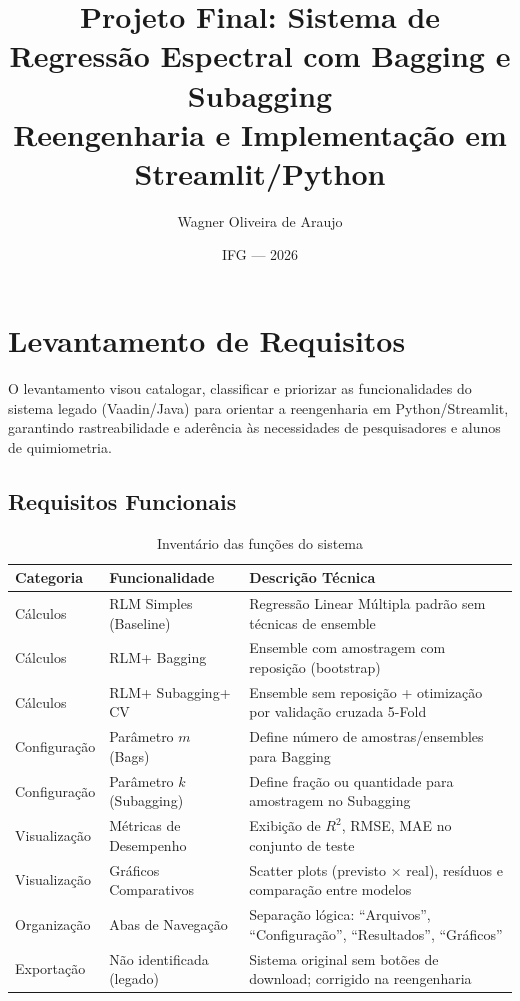 \documentclass[12pt,a4paper]{article}
\begin{document}
\title{\textbf{Projeto Final: Sistema de Regressão Espectral com Bagging e Subagging}\\
\small Reengenharia e Implementação em Streamlit/Python}
\author{Wagner Oliveira de Araujo}
\date{IFG --- 2026}
\maketitle
\thispagestyle{empty}

\newpage
\tableofcontents
\newpage

\section{Levantamento de Requisitos}

O levantamento visou catalogar, classificar e priorizar as funcionalidades do sistema legado (Vaadin/Java) para orientar a reengenharia em Python/Streamlit, garantindo rastreabilidade e aderência às necessidades de pesquisadores e alunos de quimiometria.

\subsection{Requisitos Funcionais}
\begin{table}[H]
\centering
\caption{Inventário das funções do sistema}
\begin{tabularx}{\textwidth}{l l X}
\toprule
\textbf{Categoria} & \textbf{Funcionalidade} & \textbf{Descrição Técnica} \\
\midrule
Cálculos & RLM Simples (Baseline) & Regressão Linear Múltipla padrão sem técnicas de ensemble \\
Cálculos & RLM+ Bagging & Ensemble com amostragem com reposição (bootstrap) \\
Cálculos & RLM+ Subagging+ CV & Ensemble sem reposição + otimização por validação cruzada 5-Fold \\
Configuração & Parâmetro $m$ (Bags) & Define número de amostras/ensembles para Bagging \\
Configuração & Parâmetro $k$ (Subagging) & Define fração ou quantidade para amostragem no Subagging \\
Visualização & Métricas de Desempenho & Exibição de $R^2$, RMSE, MAE no conjunto de teste \\
Visualização & Gráficos Comparativos & Scatter plots (previsto $\times$ real), resíduos e comparação entre modelos \\
Organização & Abas de Navegação & Separação lógica: ``Arquivos'', ``Configuração'', ``Resultados'', ``Gráficos'' \\
Exportação & Não identificada (legado) & Sistema original sem botões de download; corrigido na reengenharia \\
\bottomrule
\end{tabularx}
\end{table}
\end{document}
